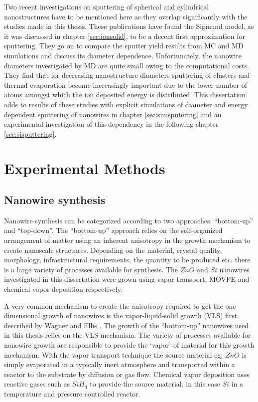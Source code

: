 Two recent investigations on sputtering of spherical \cite{nietiadi_sputtering_2014} and cylindrical \cite{urbassek_sputter_2015} nanostructures have to be mentioned here as they overlap significantly with the studies made in this thesis. These publications have found the Sigmund model, as it was discussed in chapter \ref{sec:ionsolid}, to be a decent first approximation for sputtering. They go on to compare the sputter yield results from MC and MD simulations and discuss its diameter dependence. Unfortunately, the nanowire diameters investigated by MD are quite small owing to the computational costs. They find that for decreasing nanostructure diameters sputtering of clusters and thermal evaporation become increasingly important due to the lower number of atoms amongst which the ion deposited energy is distributed. This dissertation adds to results of these studies with explicit simulations of diameter and energy dependent sputtering of nanowires in chapter \ref{sec:simsputering} and an experimental investigation of this dependency in the following chapter \ref{sec:sisputtering}.


\chapter{Experimental Methods}

\section{Nanowire synthesis}

Nanowire synthesis can be categorized according to two approaches: ``bottom-up'' and ``top-down''. The ``bottom-up'' approach relies on the self-organized arrangement of matter using an inherent anisotropy in the growth mechanism to create nanoscale structures. Depending on the material, crystal quality, morphology, infrastructural requirements, the quantity to be produced etc. there is a large variety of processes available for synthesis. The $ZnO$ \cite{borchers_catalyst_2006, stichtenoth_dimensionseffekte_2008, muller_structural_2009,cao_tuning_2010,ogrisek_kontrolliertes_2013} and $Si$ \cite{lugstein_pressure-induced_2008} nanowires investigated in this dissertation were grown using vapor transport, MOVPE and chemical vapor deposition respectively. 


A very common mechanism to create the anisotropy required to get the one dimensional growth of nanowires is the vapor-liquid-solid growth (VLS) first described by Wagner and Ellis \cite{wagner_vapor-liquid-solid_1964}. The growth of the ``bottom-up'' nanowires used in this thesis relies on the VLS mechanism. The variety of processes available for nanowire growth are responsible to provide the `vapor' of material for this growth mechanism. With the vapor transport technique the source material eg. $ZnO$ is simply evaporated in a typically inert atmosphere and transported within a reactor to the substrate by diffusion or gas flow. Chemical vapor deposition uses reactive gases such as $SiH_4$ to provide the source material, in this case $Si$ in a temperature and pressure controlled reactor. 

